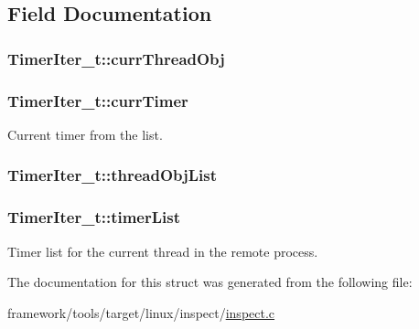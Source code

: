 \subsection{Field Documentation}
\subsubsection[{\texorpdfstring{curr\+Thread\+Obj}{currThreadObj}}]{ Timer\+Iter\+\_\+t\+::curr\+Thread\+Obj}\hypertarget{struct_timer_iter__t_a369daa88ca59865b9cafb58710b8e028}{}\label{struct_timer_iter__t_a369daa88ca59865b9cafb58710b8e028}
\subsubsection[{\texorpdfstring{curr\+Timer}{currTimer}}]{ Timer\+Iter\+\_\+t\+::curr\+Timer}\hypertarget{struct_timer_iter__t_af74ee30e948216dee2dc1da79df5ed5c}{}\label{struct_timer_iter__t_af74ee30e948216dee2dc1da79df5ed5c}


Current timer from the list. 

\subsubsection[{\texorpdfstring{thread\+Obj\+List}{threadObjList}}]{ Timer\+Iter\+\_\+t\+::thread\+Obj\+List}\hypertarget{struct_timer_iter__t_a09fbd3cc7a330d57af9065ade9461254}{}\label{struct_timer_iter__t_a09fbd3cc7a330d57af9065ade9461254}
\subsubsection[{\texorpdfstring{timer\+List}{timerList}}]{ Timer\+Iter\+\_\+t\+::timer\+List}\hypertarget{struct_timer_iter__t_a9754504defe15f98c1b2fd6ca8e48b56}{}\label{struct_timer_iter__t_a9754504defe15f98c1b2fd6ca8e48b56}


Timer list for the current thread in the remote process. 



The documentation for this struct was generated from the following file\+:\begin{DoxyCompactItemize}
\item 
framework/tools/target/linux/inspect/\hyperlink{inspect_8c}{inspect.\+c}\end{DoxyCompactItemize}
